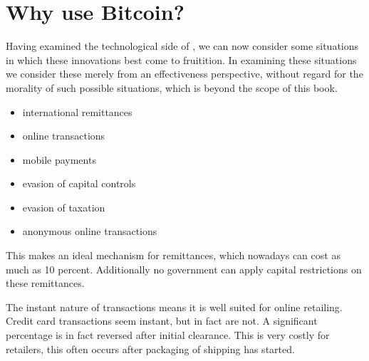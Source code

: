 
\chapter{Why use Bitcoin?}

Having examined the technological side of ,
we can now consider some situations in which these innovations best
come to fruitition. In examining these situations we consider these
merely from an effectiveness perspective, without regard for the morality
of such possible situations, which is beyond the scope of this book.
\begin{itemize}
\item international remittances
\item online transactions
\item mobile payments
\item evasion of capital controls
\item evasion of taxation
\item anonymous online transactions
\end{itemize}
This makes  an ideal mechanism for remittances,
which nowadays can cost as much as 10 percent. Additionally no government
can apply capital restrictions on these remittances. 

The instant nature of transactions means it is well suited for online
retailing. Credit card transactions seem instant, but in fact are
not. A significant percentage is in fact reversed after initial clearance.
This is very costly for retailers, this often occurs after packaging
of shipping has started.
